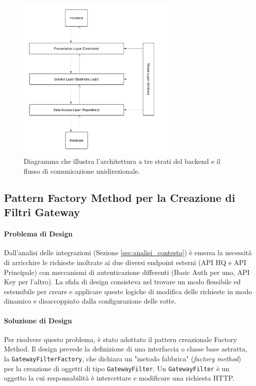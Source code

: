 \documentclass[12pt,a4paper,openright,twoside]{book}
\begin{document}
\begin{figure}[H]
    \centering
    \includegraphics[width=0.7\textwidth]{figures/layer_design.pdf}
    \caption{Diagramma che illustra l'architettura a tre strati del backend e il flusso di comunicazione unidirezionale.}
    \label{fig:layered_architecture_uml}
\end{figure}

\subsection{Pattern Factory Method per la Creazione di Filtri Gateway}
\label{subsec:design_factory}

\paragraph{Problema di Design}
Dall'analisi delle integrazioni (Sezione \ref{sec:analisi_contesto}) è emersa la necessità di arricchire le richieste inoltrate ai due diversi endpoint esterni (API HQ e API Principale) con meccanismi di autenticazione differenti (Basic Auth per uno, API Key per l'altro). La sfida di design consisteva nel trovare un modo flessibile ed estensibile per creare e applicare queste logiche di modifica delle richieste in modo dinamico e disaccoppiato dalla configurazione delle rotte.


\paragraph{Soluzione di Design}
Per risolvere questo problema, è stato adottato il pattern creazionale Factory Method. Il design prevede la definizione di una interfaccia o classe base astratta, la \texttt{GatewayFilterFactory}, che dichiara un "metodo fabbrica" (\textit{factory method}) per la creazione di oggetti di tipo \texttt{GatewayFilter}. Un \texttt{GatewayFilter} è un oggetto la cui responsabilità è intercettare e modificare una richiesta HTTP.
\end{document}
